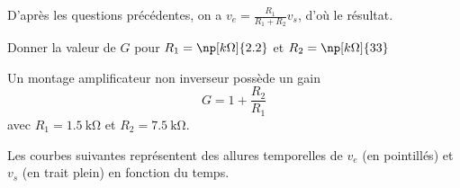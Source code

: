 
\begin{corrige}
  D’après les questions précédentes, on a \(v_{e} = \frac{R_{1}}{R_{1}+R_{2}}v_{s}\), d’où le résultat.
\end{corrige}




\begin{enonce}
  Donner la valeur de \(G\) pour \(R_{1} = \np[k\Omega]{2.2}\) et \(R_{2} = \np[k\Omega]{33}\)
\end{enonce}




\finEntrainement


\newpage







\hauteurLargeurCadreReponse		{8mm}{3.5cm}
\initialisationEntrainement

\debutEntrainement

Un montage amplificateur non inverseur possède un gain 
\[
G = 1+\frac{R_{2}}{R_{1}}
\]
avec \(R_{1} = \SI{1.5}{\kilo\ohm}\) et \(R_{2} = \SI{7.5}{\kilo\ohm}\).

Les courbes suivantes représentent des allures temporelles de \(v_{e}\) (en pointillés) et \(v_{s}\) (en trait plein) en fonction du temps. 

